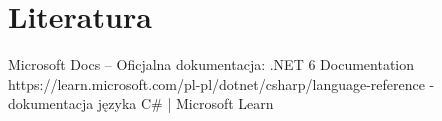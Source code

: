 \section{Literatura}

\noindent Microsoft Docs – Oficjalna dokumentacja: .NET 6 Documentation 
\newline
https://learn.microsoft.com/pl-pl/dotnet/csharp/language-reference - dokumentacja języka C\# | Microsoft Learn 
